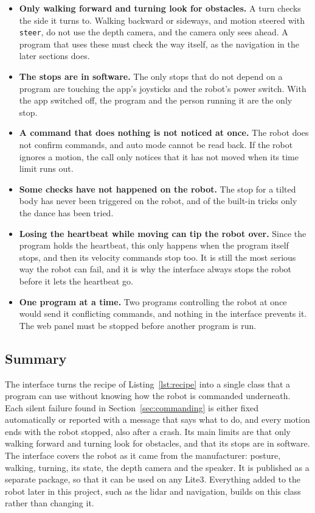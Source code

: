 \begin{itemize}
  \item \textbf{Only walking forward and turning look for obstacles.} A turn checks the side it turns to.
    Walking backward or sideways, and motion steered with \texttt{steer}, do not use the depth camera, and
    the camera only sees ahead. A program that uses
    these must check the way itself, as the navigation in the later sections does.
  \item \textbf{The stops are in software.} The only stops that do not depend on a program are touching the
    app's joysticks and the robot's power switch. With the app switched off, the program and the person
    running it are the only stop.
  \item \textbf{A command that does nothing is not noticed at once.} The robot does not confirm commands, and
    auto mode cannot be read back. If the robot ignores a motion, the call only notices that it has not moved
    when its time limit runs out.
  \item \textbf{Some checks have not happened on the robot.} The stop for a tilted body has never been
    triggered on the robot, and of the built-in tricks only the dance has been tried.
  \item \textbf{Losing the heartbeat while moving can tip the robot over.} Since the program holds the
    heartbeat, this only happens when the program itself stops, and then its velocity commands stop too.
    It is still the most serious way the robot can fail, and it is why the interface always stops the
    robot before it lets the heartbeat go.
  \item \textbf{One program at a time.} Two programs controlling the robot at once would send it conflicting
    commands, and nothing in the interface prevents it. The web panel must be stopped before another program
    is run.
\end{itemize}

\subsection{Summary}
\label{sec:interface-summary}

The interface turns the recipe of Listing~\ref{lst:recipe} into a single class that a program can use
without knowing how the robot is commanded underneath. Each silent failure found in
Section~\ref{sec:commanding} is either fixed automatically or reported with a message that says what to do,
and every motion ends with the robot stopped, also after a crash. Its main limits are that only walking
forward and turning look for obstacles, and that its stops are in software. The interface covers the robot as it came
from the manufacturer: posture, walking, turning, its state, the depth camera and the speaker. It is
published as a separate package, so that it can be used on any Lite3. Everything added to the robot later
in this project, such as the lidar and navigation, builds on this class rather than changing it.


